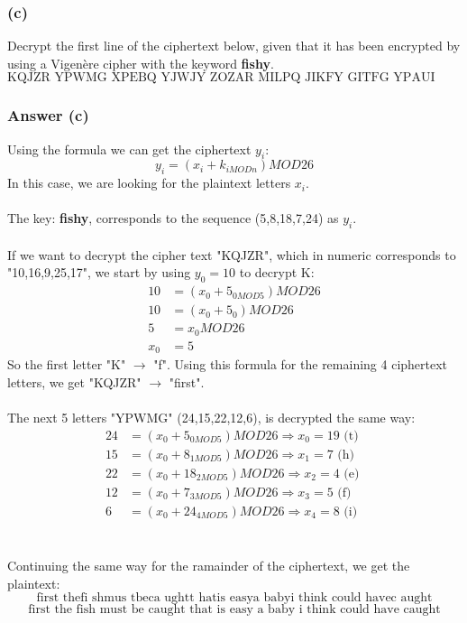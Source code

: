 \documentclass{article}
\begin{document}
	\subsubsection*{(c)}
	Decrypt the first line of the ciphertext below, given that it has been encrypted by
	using a Vigenère cipher with the keyword \textbf{fishy}.
	$$
	\text{KQJZR YPWMG XPEBQ YJWJY ZOZAR MILPQ JIKFY GITFG YPAUI HWMSB MINLA FCYOR}
	$$
	
	\subsubsection*{Answer (c)}
	Using the formula we can get the ciphertext $y_i$:
	$$
	y_i = (x_i + k_{i MOD n}) MOD 26
	$$
	In this case, we are looking for the plaintext letters $x_i$.
	\\\\
	The key: \textbf{fishy}, corresponds to the sequence (5,8,18,7,24) as $y_i$. 
	\\\\
	If we want to decrypt the cipher text "KQJZR", which in numeric corresponds to "10,16,9,25,17", we start by using $y_0 = 10$ to decrypt K:
	\[
	\begin{split}
	10 	&= (x_0 + 5_{0 MOD 5}) MOD 26 \\
	10	&= (x_0 + 5_0) MOD 26 \\
	5	&= x_0 MOD 26 \\
	x_0 &= 5
	\end{split}
	\]
	So the first letter "K" $\rightarrow$ "f". Using this formula for the remaining 4 ciphertext letters, we get "KQJZR" $\rightarrow$ "first".
	\\\\
	The next 5 letters "YPWMG" (24,15,22,12,6), is decrypted the same way:
	\[
	\begin{split}
	24 	&= (x_0 + 5_{0 MOD 5}) MOD 26 \Rightarrow x_0 = 19 \text{ (t) } \\
	15 	&= (x_0 + 8_{1 MOD 5}) MOD 26 \Rightarrow x_1 = 7 \text{ (h) } \\
	22 	&= (x_0 + 18_{2 MOD 5}) MOD 26 \Rightarrow x_2 = 4 \text{ (e) }\\
	12 	&= (x_0 + 7_{3 MOD 5}) MOD 26 \Rightarrow x_3 = 5 \text{ (f) }\\
	6 	&= (x_0 + 24_{4 MOD 5}) MOD 26 \Rightarrow x_4 = 8 \text{ (i) }
	\end{split}
	\]
	\\\\
	Continuing the same way for the ramainder of the ciphertext, we get the plaintext:
	$$
	\text{first thefi shmus tbeca ughtt hatis easya babyi think could havec aught}
	$$
	$$
	\text{first the fish must be caught that is easy a baby i think could have caught}
	$$
	
\end{document}
